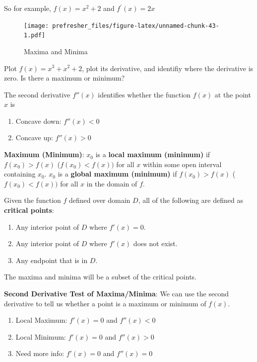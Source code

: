 \documentclass[]{book}
\providecommand{\tightlist}{%
  \setlength{\itemsep}{0pt}\setlength{\parskip}{0pt}}
\theoremstyle{definition}
\theoremstyle{definition}
\theoremstyle{definition}
\theoremstyle{remark}
\let\BeginKnitrBlock\begin \let\EndKnitrBlock\end
\begin{document}
So for example, \(f(x) = x^2 + 2\) and \(f^\prime(x) = 2x\)

\begin{figure}
\centering
\texttt{[image: prefresher\_files/figure-latex/unnamed-chunk-43-1.pdf]}
\caption{\label{fig:unnamed-chunk-43}Maxima and Minima}
\end{figure}

\BeginKnitrBlock{exercise}[Plotting a mazimum and minimum]
\protect\hypertarget{exr:unnamed-chunk-44}{}{\label{exr:unnamed-chunk-44}
{} }Plot
\(f(x)=x^3+ x^2 + 2\), plot its derivative, and identifiy where the
derivative is zero. Is there a maximum or minimum?
\EndKnitrBlock{exercise}

The second derivative \(f''(x)\) identifies whether the function
\(f(x)\) at the point \(x\) is

\begin{enumerate}
\def\labelenumi{\arabic{enumi}.}
\tightlist
\item
  Concave down: \(f''(x)<0\)
\item
  Concave up: \(f''(x)>0\)
\end{enumerate}

\textbf{Maximum (Minimum)}: \(x_0\) is a \textbf{local maximum
(minimum)} if \(f(x_0)>f(x)\) (\(f(x_0)<f(x))\) for all \(x\) within
some open interval containing \(x_0\). \(x_0\) is a \textbf{global
maximum (minimum)} if \(f(x_0)>f(x)\) (\(f(x_0)<f(x))\) for all \(x\) in
the domain of \(f\).

Given the function \(f\) defined over domain \(D\), all of the following
are defined as \textbf{critical points}:

\begin{enumerate}
\def\labelenumi{\arabic{enumi}.}
\tightlist
\item
  Any interior point of \(D\) where \(f'(x)=0\).
\item
  Any interior point of \(D\) where \(f'(x)\) does not exist.
\item
  Any endpoint that is in \(D\).
\end{enumerate}

The maxima and minima will be a subset of the critical points.

\textbf{Second Derivative Test of Maxima/Minima}: We can use the second
derivative to tell us whether a point is a maximum or minimum of
\(f(x)\).

\begin{enumerate}
\def\labelenumi{\arabic{enumi}.}
\tightlist
\item
  Local Maximum: \(f'(x)=0\) and \(f''(x)<0\)
\item
  Local Minimum: \(f'(x)=0\) and \(f''(x)>0\)
\item
  Need more info: \(f'(x)=0\) and \(f''(x)=0\)
\end{enumerate}
\end{document}
